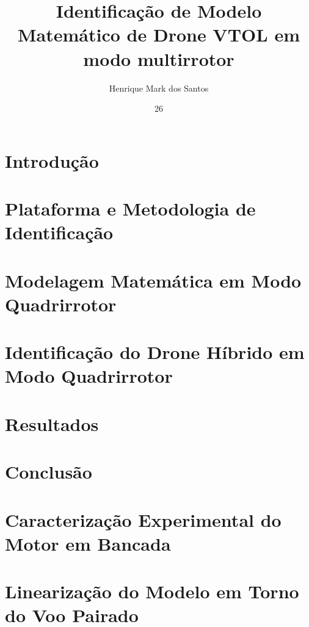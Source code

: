 \documentclass[msc]{ita}    %
\author{Henrique Mark dos Santos}{Corrêa}
\title{Identificação de Modelo Matemático de Drone VTOL em modo multirrotor}
\date{26}{agosto}{2026}
\begin{document}


\mainmatter

\chapter{Introdução}


\chapter{Plataforma e Metodologia de Identificação}\label{chap:metodologia}



\chapter{Modelagem Matemática em Modo Quadrirrotor}\label{chap:modelagem}


\chapter{Identificação do Drone Híbrido em Modo Quadrirrotor}\label{chap:identificacao}


\chapter{Resultados}\label{chap:resultados}


\chapter{Conclusão}


\renewcommand\bibname{\itareferencesnamebabel} %
\printbibliography

\appendix
\chapter[Ensaios de Bancada do Motor]{Caracterização Experimental do Motor em Bancada}\label{ap:bancada}


\chapter[Linearização do Modelo]{Linearização do Modelo em Torno do Voo Pairado}\label{ap:linearizacao}

\end{document}
